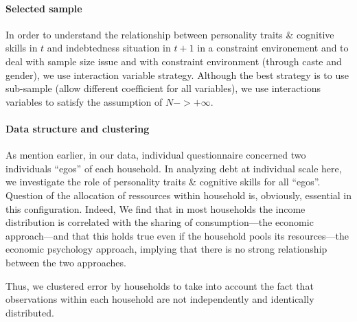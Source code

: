 \documentclass[a4paper, 11pt, onecolumn]{article}
\begin{document}
\paragraph{Selected sample}

In order to understand the relationship between personality traits \& cognitive skills in $t$ and indebtedness situation in $t+1$ in a constraint environement and to deal with sample size issue and with constraint environment (through caste and gender), we use interaction variable strategy.
Although the best strategy is to use sub-sample (allow different coefficient for all variables), we use interactions variables to satisfy the assumption of $N->+\infty$.


\paragraph{Data structure and clustering}
As mention earlier, in our data, individual questionnaire concerned two individuals ``egos'' of each household.
In analyzing debt at individual scale here, we investigate the role of personality traits \& cognitive skills for all ``egos''.
Question of the allocation of ressources within household is, obviously, essential in this configuration.
Indeed, \citep{Lazear1988}
\citep{Bonke2015} We find that in most households the income distribution is correlated with the sharing of consumption—the economic approach—and that this holds true even if the household pools its resources—the economic psychology approach, implying that there is no strong relationship between the two approaches.

Thus, we clustered error by households to take into account the fact that observations within each household are not independently and identically distributed.
\end{document}
